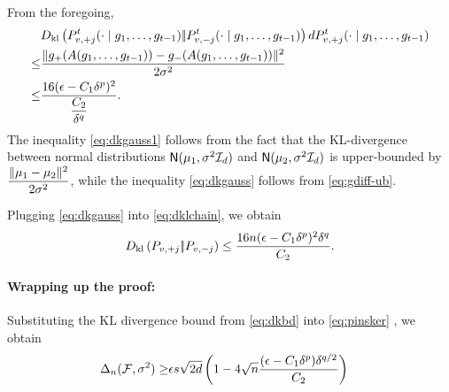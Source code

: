 From the foregoing, 
\begin{align}
 &D_{\rm kl}\left({P_{v,+j}^t(\cdot\mid g_1,\ldots,g_{t-1})} |\!| {P_{v,-j}^t(\cdot\mid g_1,\ldots,g_{t-1})} \right) d P_{v,+j}^t(\cdot\mid g_1,\ldots,g_{t-1}) \nonumber\\
 \le&\dfrac{\|g_{+}(A(g_1,\ldots,g_{t-1})) - g_{-}(A(g_1,\ldots,g_{t-1}))\|^2}{2 \sigma^2}\label{eq:dkgauss1}\\
 \le& \dfrac{16(\epsilon-C_1\delta^p)^2}{\dfrac{C_2}{\delta^q}}.\label{eq:dkgauss}
\end{align}
The inequality \eqref{eq:dkgauss1} follows from the fact that the KL-divergence between normal distributions $\mathsf{N}(\mu_1,\sigma^2\mathcal{I}_d)$ and $\mathsf{N}(\mu_2,\sigma^2\mathcal{I}_d)$ is upper-bounded by $\dfrac{\|\mu_1 - \mu_2\|^2}{2 \sigma^2}$, while the inequality \eqref{eq:dkgauss} follows from \eqref{eq:gdiff-ub}.

Plugging \eqref{eq:dkgauss} into \eqref{eq:dklchain}, we obtain
\begin{align}
D_{\rm kl}\left({P_{v,+j}} |\!| {P_{v,-j}} \right) \le \dfrac{16n(\epsilon-C_1\delta^p)^2 \delta^q}{C_2}.\label{eq:dkbd}
\end{align}

\paragraph{Wrapping up the proof:}

Substituting the KL divergence bound from \eqref{eq:dkbd}  into \eqref{eq:pinsker} , we obtain
\begin{align}
 \Delta_n(\mathcal{F}, \sigma^2) 
  \ge & \epsilon s \sqrt{2d} \left(1 - 4\sqrt{
    n}  \dfrac{(\epsilon-C_1\delta^p)\delta^{q/2}}{C_2}
  \right)\label{eq:final-lower-bd}
\end{align}

